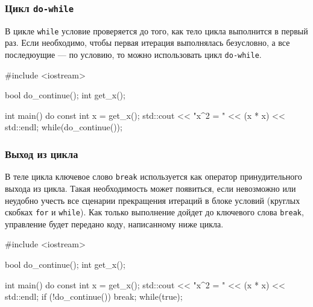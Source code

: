 \documentclass[compress, 8pt]{beamer}
\begin{document}
\begin{frame}[fragile]

    \frametitle{Цикл \texttt{do-while}}

    В цикле \verb|while| условие проверяется до того, как тело цикла
    выполнится в первый раз.
    Если необходимо, чтобы первая итерация выполнялась безусловно, а
    все последюущие — по условию, то можно использовать цикл
    \verb|do-while|.

    \begin{myinplacelisting}[minted language=cpp]
#include <iostream>

bool do_continue();
int get_x();

int main() {
    do {
        const int x = get_x();
        std::cout << "x^2 = " << (x * x) << std::endl;
    } while(do_continue());
}
    \end{myinplacelisting}

\end{frame}

\begin{frame}[fragile]

    \frametitle{Выход из цикла}

    \hfill \break

    В теле цикла ключевое слово \verb|break| используется как оператор
    принудительного выхода из цикла.
    Такая необходимость может появиться, если невозможно или
    неудобно учесть все сценарии прекращения итераций в блоке условий
    (круглых скобках \verb|for| и \verb|while|).
    Как только выполнение дойдет до ключевого слова \verb|break|,
    управление будет передано коду, написанному ниже цикла.

    \begin{myinplacelisting}[minted language=cpp]
#include <iostream>

bool do_continue();
int get_x();

int main() {
    do {
        const int x = get_x();
        std::cout << "x^2 = " << (x * x) << std::endl;
        if (!do_continue()) {
            break;
        }
    } while(true);
}
    \end{myinplacelisting}
\end{frame}
\end{document}
